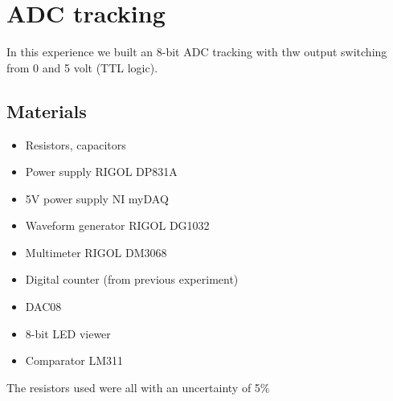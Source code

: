 \chapter{ADC tracking}
In this experience we built an 8-bit ADC tracking with thw output switching from 0 and 5 volt (TTL logic).

\section{Materials}
\begin{itemize}
\item Resistors, capacitors
\item Power supply RIGOL DP831A
\item 5V power supply NI myDAQ
\item Waveform generator RIGOL DG1032
\item Multimeter RIGOL DM3068
\item Digital counter (from previous experiment)
\item DAC08
\item 8-bit LED viewer
\item Comparator LM311
\end{itemize}
The resistors used were all with an uncertainty of 5\%

